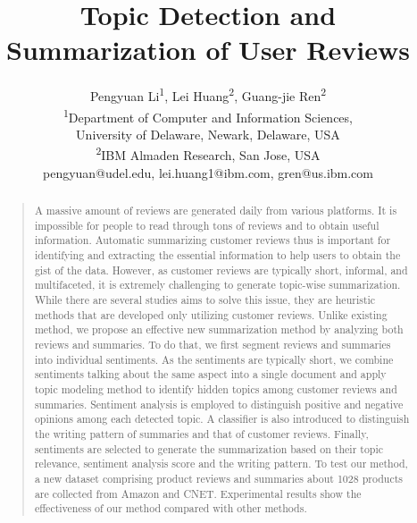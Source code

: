 \documentclass[letterpaper]{article}
\title{Topic Detection and Summarization of User Reviews}
\author{Pengyuan Li\textsuperscript{\rm 1}, Lei Huang\textsuperscript{\rm 2}, Guang-jie Ren\textsuperscript{\rm 2}\\
\textsuperscript{\rm 1}Department of Computer and Information Sciences, \\University of Delaware, Newark, Delaware, USA\\
\textsuperscript{\rm 2}IBM Almaden Research, San Jose, USA\\
pengyuan@udel.edu,
lei.huang1@ibm.com, gren@us.ibm.com}
\begin{document}
\maketitle

\begin{abstract}
\begin{quote}
A massive amount of reviews are generated daily from various platforms. 
It is impossible for people to read through tons of reviews and to obtain useful information. 
Automatic summarizing customer reviews thus is important for identifying and extracting the essential information to help users to obtain the gist of the data. 
However, as customer reviews are typically short, informal, and multifaceted, it is extremely challenging to generate topic-wise summarization.
While there are several studies aims to solve this issue, they are heuristic methods that are developed only utilizing customer reviews. 
Unlike existing method, we propose an effective new summarization method by analyzing both reviews and summaries.
To do that, we first segment reviews and summaries into individual sentiments. 
As the sentiments are typically short, we combine sentiments talking about the same aspect into a single document and apply topic modeling method to identify hidden topics among customer reviews and summaries. 
Sentiment analysis is employed to distinguish positive and negative opinions among each detected topic. 
A classifier is also introduced to distinguish the writing pattern of summaries and that of customer reviews. 
Finally, sentiments are selected to generate the summarization based on their topic relevance, sentiment analysis score and the writing pattern. 
To test our method, a new dataset comprising product reviews and summaries about 1028 products are collected from Amazon and CNET. Experimental results show the effectiveness of our method compared with other methods. 
\end{quote}
\end{abstract}
\end{document}
